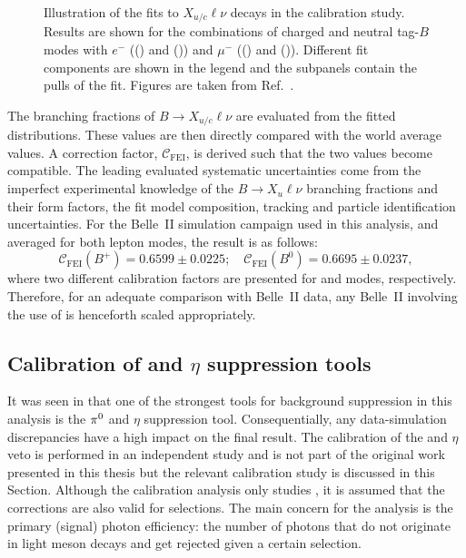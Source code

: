\begin{figure}[hbtp!]
{    }
    \caption{\label{fig:fei_calib} Illustration of the fits to \B\to$X_{u/c}\ell\nu$ decays in the \FEI calibration study.
    Results are shown for the combinations of charged and neutral tag-$B$ modes with $e^-$ (() and ()) and $\mu^-$ (() and ()).
    Different fit components are shown in the legend and the subpanels contain the pulls of the fit.
    Figures are taken from Ref.~\cite{Belle-II:2020fst}.
    }
\end{figure}

The branching fractions of $B\rightarrow X_{u/c}\ell\nu$ are evaluated from the fitted distributions.
These values are then directly compared with the world average values.
A correction factor, $\mathcal{C}_{\mathrm{FEI}}$, is derived such that the two values become compatible.
The leading evaluated systematic uncertainties come from the imperfect experimental knowledge of the $B\rightarrow X_u\ell\nu$ branching fractions and their form factors, the fit model composition, tracking and particle identification uncertainties.
For the Belle~II simulation campaign used in this analysis, and averaged for both lepton modes, the result is as follows:
\begin{equation}\label{eq:fei_calibration}
    \mathcal{C}_{\mathrm{FEI}}(B^+) = 0.6599 \pm 0.0225; \quad \mathcal{C}_{\mathrm{FEI}}(B^0) = 0.6695 \pm 0.0237,
\end{equation}
where two different calibration factors are presented for \feiBp and \feiBz modes, respectively.
Therefore, for an adequate comparison with Belle~II data, any Belle~II \MC involving the use of \FEI is henceforth scaled appropriately.

\subsection{Calibration of \texorpdfstring{\piz}{pi0} and \texorpdfstring{$\eta$}{eta} suppression tools}\label{sec:piz_eta_calibration}
It was seen in  that one of the strongest tools for background suppression in this analysis is the $\pi^0$ and $\eta$ suppression tool.
Consequentially, any data-simulation discrepancies have a high impact on the final result.
The calibration of the \piz and $\eta$ veto is performed in an independent study and is not part of the original work presented in this thesis 
but the relevant calibration study is discussed in this Section.
Although the calibration analysis only studies \piVeto, it is assumed that the corrections are also valid for \etaVeto selections.
The main concern for the \BtoXsgamma analysis is the primary (signal) photon efficiency: the number of photons that do not originate in light meson decays and get rejected given a certain \piVeto selection.

